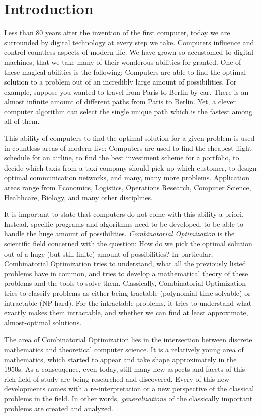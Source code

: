 \chapter{Introduction}
Less than 80 years after the invention of the first computer, today we are surrounded by digital technology at every step we take. 
Computers influence and control countless aspects of modern life. 
We have grown so accustomed to digital machines, that we take many of their wonderous abilities for granted. 
One of these magical abilities is the following: Computers are able to find the optimal solution to a problem out of an incredibly large amount of possibilities.
For example, suppose you wanted to travel from Paris to Berlin by car. There is an almost infinite amount of different paths from Paris to Berlin. Yet, a clever computer algorithm can select the single unique path which is the fastest among all of them.

This ability of computers to find the optimal solution for a given problem is used in countless areas of modern live: Computers are used to find the cheapest flight schedule for an airline, to find the best investment scheme for a portfolio, to decide which taxis from a taxi company should pick up which customer, to design optimal communication networks, and many, many more problems. Application areas range from Economics, Logistics, Operations Research, Computer Science, Healthcare, Biology, and many other disciplines.

It is important to state that computers do not come with this ability a priori. Instead, specific programs and algorithms need to be developed, to be able to handle the huge amount of possibilities. 
\emph{Combinatorial Optimization} is the scientific field concerned with the question: How do we pick the optimal solution out of a huge (but still finite) amount of possibilities? 
In particular, Combinatorial Optimization tries to understand, what all the previously listed problems have in common, and tries to develop a mathematical theory of these problems and the tools to solve them. Classically, Combinatorial Optimization tries to classify problems as either being tractable (polynomial-time solvable) or intractable (NP-hard). For the intractable problems, it tries to understand what exactly makes them intractable, and whether we can find at least approximate, almost-optimal solutions.

The area of Combinatorial Optimization lies in the intersection between discrete mathematics and theoretical computer science. 
It is a relatively young area of mathematics, which started to appear and take shape approximately in the 1950s. 
As a conseuqence, even today, still many new aspects and facets of this rich field of study are being researched and discovered. Every of this new developments comes with a re-interpretation or a new perspective of the classical problems in the field. In other words, \emph{generalizations} of the classically important problems are created and analyzed.

